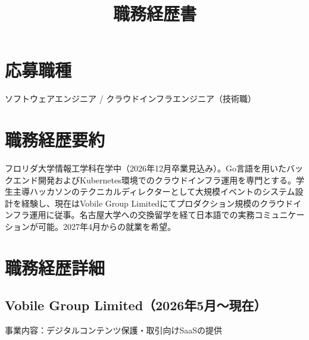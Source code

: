 \documentclass[dvipdfmx,a4paper]{jsarticle}
\title{職務経歴書}
\author{\shortstack{GUTIERREZ Phoenix \\（グティエレス フェニックス）}}
\date{\jpdate}
\begin{document}
\maketitle

\section{応募職種}
ソフトウェアエンジニア / クラウドインフラエンジニア（技術職）

\section{職務経歴要約}
フロリダ大学情報工学科在学中（2026年12月卒業見込み）。Go言語を用いたバックエンド開発およびKubernetes環境でのクラウドインフラ運用を専門とする。学生主導ハッカソンのテクニカルディレクターとして大規模イベントのシステム設計を経験し、現在はVobile Group Limitedにてプロダクション規模のクラウドインフラ運用に従事。名古屋大学への交換留学を経て日本語での実務コミュニケーションが可能。2027年4月からの就業を希望。

\section{職務経歴詳細}

\subsection*{Vobile Group Limited（2026年5月～現在）}
事業内容：デジタルコンテンツ保護・取引向けSaaSの提供
\end{document}
